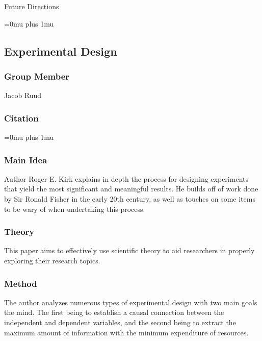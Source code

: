 \noindent
Future Directions 

\Urlmuskip=0mu plus 1mu\relax

\noindent
\subsection{{Experimental} {Design}}

\subsubsection{Group Member}

\noindent
Jacob Ruud

\noindent
\subsubsection{Citation}

\Urlmuskip=0mu plus 1mu\relax

\subsubsection{Main Idea}

\noindent
Author Roger E. Kirk explains in depth the process for designing experiments that yield the most significant and meaningful results. He builds off of work done by Sir Ronald Fisher in the early 20th century, as well as touches on some items to be wary of when undertaking this process.

\subsubsection{Theory}

\noindent
This paper aims to effectively use scientific theory to aid researchers in properly exploring their research topics.

\subsubsection{Method}

\noindent
The author analyzes numerous types of experimental design with two main goals the mind. The first being to establish a causal connection between the independent and dependent variables, and the second being to extract the maximum amount of information with the minimum expenditure of resources.

